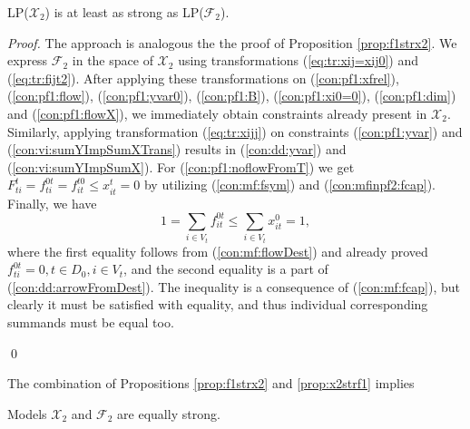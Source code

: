 \begin{prop}
\label{prop:x2strf1}
LP($\mathcal{X}_2$) is at least as strong as LP($\mathcal{F}_2$). 
\end{prop}
\begin{proof}
The approach is analogous the the proof of Proposition \ref{prop:f1strx2}.
We express $\mathcal{F}_2$ in the space of $\mathcal{X}_2$ using transformations (\ref{eq:tr:xij=xij0}) and (\ref{eq:tr:fijt2}).
After applying these transformations on (\ref{con:pf1:xfrel}), (\ref{con:pf1:flow}), (\ref{con:pf1:yvar0}), (\ref{con:pf1:B}), (\ref{con:pf1:xi0=0}), (\ref{con:pf1:dim}) and (\ref{con:pf1:flowX}), we immediately obtain constraints already present in $\mathcal{X}_2$.
Similarly, applying transformation (\ref{eq:tr:xijj}) on constraints (\ref{con:pf1:yvar}) and (\ref{con:vi:sumYImpSumXTrans}) results in (\ref{con:dd:yvar}) and (\ref{con:vi:sumYImpSumX}).
For (\ref{con:pf1:noflowFromT}) we get $F^t_{ti}=f^{0t}_{ti}=f^{t0}_{it}\leq x^t_{it}=0$ by utilizing (\ref{con:mf:fsym}) and (\ref{con:mfinpf2:fcap}).
Finally, we have $$1=\sum_{i\in V_t}f^{0t}_{it}\leq \sum_{i\in V_t}x^0_{it}=1,$$ where the first equality follows from (\ref{con:mf:flowDest}) and already proved $f^{0t}_{ti}=0, t\in D_0,i\in V_t$, and the second equality is a part of (\ref{con:dd:arrowFromDest}).
The inequality is a consequence of (\ref{con:mf:fcap}), but clearly it must be satisfied with equality, and thus individual corresponding summands must be equal too.
 
\qed
\end{proof}
The combination of Propositions \ref{prop:f1strx2} and \ref{prop:x2strf1} implies
\begin{corollary}
Models $\mathcal{X}_2$ and $\mathcal{F}_2$ are equally strong.
\end{corollary}
